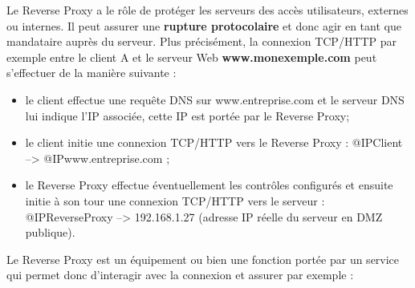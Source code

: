 Le Reverse Proxy a le rôle de protéger les serveurs des accès utilisateurs, externes ou internes.
Il peut assurer une \textbf{rupture protocolaire} et donc agir en tant que mandataire auprès du serveur.
Plus précisément, la connexion TCP/HTTP par exemple entre le client A et le serveur Web \textbf{www.monexemple.com} peut s'effectuer de la manière suivante : 
\begin{itemize}
    \item le client effectue une requête DNS sur www.entreprise.com et le serveur DNS lui indique l'IP associée, cette IP est portée par le Reverse Proxy;
    \item le client initie une connexion TCP/HTTP vers le Reverse Proxy : @IPClient --> @IPwww.entreprise.com ;
    \item le Reverse Proxy effectue éventuellement les contrôles configurés et ensuite initie à son tour une connexion TCP/HTTP vers le serveur : @IPReverseProxy --> 192.168.1.27 (adresse IP réelle du serveur en DMZ publique). 
\end{itemize}
Le Reverse Proxy est un équipement ou bien une fonction portée par un service qui permet donc d'interagir avec la connexion et assurer par exemple :
